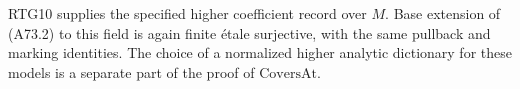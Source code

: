 RTG10 supplies the specified higher coefficient record over $M$.
Base extension of (A73.2) to this field is again finite \'etale
surjective, with the same pullback and marking identities. The
choice of a normalized higher analytic dictionary for these models
is a separate part of the proof of $\mathrm{CoversAt}$.
